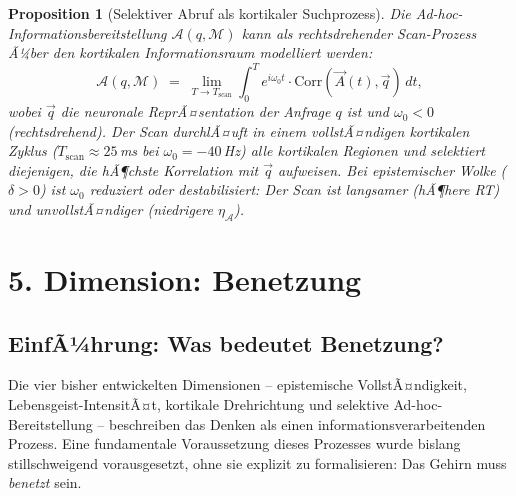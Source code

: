 ﻿\documentclass[12pt,a4paper]{report}
\theoremstyle{plain}
\newtheorem{proposition}[theorem]{Proposition}
\theoremstyle{definition}
\theoremstyle{remark}
\begin{document}
	\begin{proposition}[Selektiver Abruf als kortikaler Suchprozess]
		\label{prop:scan}
		Die Ad-hoc-Information\-sbereitstellung $\mathcal{A}(q, \mathcal{M})$
		kann als rechtsdrehender Scan-Prozess Ã¼ber den kortikalen Informationsraum
		modelliert werden:
		\[
		\mathcal{A}(q, \mathcal{M})
		\;=\;
		\lim_{T\to T_{\mathrm{scan}}}
		\int_0^T e^{i\omega_0 t} \cdot \mathrm{Corr}(\vec{A}(t), \vec{q})\,dt,
		\]
		wobei $\vec{q}$ die neuronale ReprÃ¤sentation der Anfrage $q$ ist
		und $\omega_0 < 0$ (rechtsdrehend).
		Der Scan durchlÃ¤uft in einem vollstÃ¤ndigen kortikalen Zyklus
		($T_{\mathrm{scan}} \approx 25$\,ms bei $\omega_0 = -40$\,Hz)
		alle kortikalen Regionen und selektiert diejenigen, die hÃ¶chste
		Korrelation mit $\vec{q}$ aufweisen.
		Bei epistemischer Wolke ($\delta > 0$) ist $\omega_0$ reduziert
		oder destabilisiert: Der Scan ist langsamer (hÃ¶here RT) und
		unvollstÃ¤ndiger (niedrigere $\eta_{\mathcal{A}}$).
	\end{proposition}
	
	\chapter{5. Dimension: Benetzung}

	\section{EinfÃ¼hrung: Was bedeutet Benetzung?}

	Die vier bisher entwickelten Dimensionen -- epistemische VollstÃ¤ndigkeit,
	Lebensgeist-IntensitÃ¤t, kortikale Drehrichtung und selektive
	Ad-hoc-Bereitstellung -- beschreiben das Denken als einen
	informationsverarbeitenden Prozess. Eine fundamentale Voraussetzung
	dieses Prozesses wurde bislang stillschweigend vorausgesetzt, ohne sie
	explizit zu formalisieren: Das Gehirn muss \emph{benetzt} sein.
\end{document}
